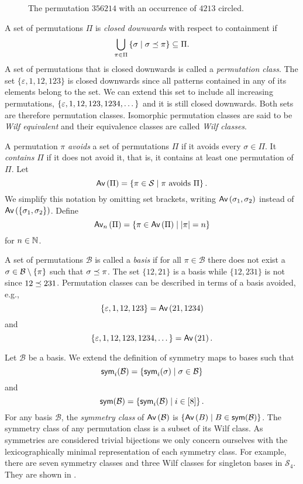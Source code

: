 \begin{figure}[htbp]
    \centering
    
    \caption{The permutation $356214$ with an occurrence of $4213$ circled.}
    \label{fig:pattern_containment}
\end{figure}

A set of permutations $\Pi$ is \emph{closed downwards} with respect to containment if 
\[
    \bigcup_{\pi \in \Pi}\cset{\sigma}{\contains{\pi}{\sigma}} \subseteq \Pi.
\]
A set of permutations that is closed downwards is called a \emph{permutation class}. The set $\{\varepsilon, 1, 12, 123\}$ is closed downwards since all patterns contained in any of its elements belong to the set. We can extend this set to include all increasing permutations, $\set{\varepsilon, 1, 12, 123, 1234, \dotsc}$ and it is still closed downwards. Both sets are therefore permutation classes. Isomorphic permutation classes are said to be \emph{Wilf equivalent} and their equivalence classes are called \emph{Wilf classes}.

A permutation $\pi$ \emph{avoids} a set of permutations $\Pi$ if it avoids every $\sigma \in \Pi$. It \emph{contains} $\Pi$ if it does not avoid it, that is, it contains at least one permutation of $\Pi$. Let 
\[
    \Av{\Pi} = \cset{\pi \in \mathcal{S}}{\pi \text{ avoids } \Pi}.
\]
We simplify this notation by omitting set brackets, writing $\Av{\sigma_1,\sigma_2}$ instead of $\Av{\set{\sigma_1,\sigma_2}}$. Define \[
    \Avn{n}{\Pi} = \cset{\pi \in \Av{\Pi}}{|\pi| = n}
\]
for $n\in\N$.

A set of permutations $\mathcal{B}$ is called a \emph{basis} if for all $\pi\in\mathcal{B}$ there does not exist a $\sigma \in \mathcal{B} \setminus \set{\pi}$ such that $\contains{\pi}{\sigma}$. The set $\{12,21\}$ is a basis while $\{12,231\}$ is not since $\contains{231}{12}$. Permutation classes can be described in terms of a basis avoided, e.g., 
\[
    \{\varepsilon,1,12,123\} = \Av{21, 1234}
\]
and
\[
    \{\varepsilon, 1, 12, 123, 1234,\dotsc\} = \Av{21}.
\]

Let $\mathcal{B}$ be a basis. We extend the definition of symmetry maps to bases such that
\[
    \sym_i(\mathcal{B}) = \cset{\sym_i(\sigma)}{\sigma \in \mathcal{B}}
\]
and
\[
    \sym(\mathcal{B}) = \cset{\sym_i(\mathcal{B})}{i \in [8]}.
\]
For any basis $\mathcal{B}$, the \emph{symmetry class} of $\Av{\mathcal{B}}$ is $\cset{\Av{B}}{B \in \sym(\mathcal{B})}$. The symmetry class of any permutation class is a subset of its Wilf class. As symmetries are considered trivial bijections we only concern ourselves with the lexicographically minimal representation of each symmetry class. For example, there are seven symmetry classes and three Wilf classes for singleton bases in $\mathcal{S}_4$. They are shown in .

